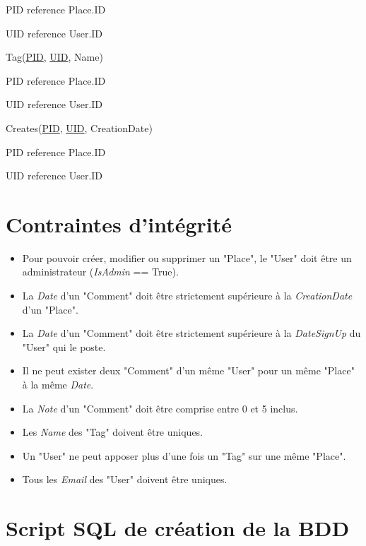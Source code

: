 \documentclass[a4paper,10pt]{article}
\begin{document}
PID reference Place.ID

UID reference User.ID

\hspace{-0,5cm}Tag(\underline{PID}, \underline{UID}, Name)

PID reference Place.ID

UID reference User.ID

\hspace{-0,5cm}Creates(\underline{PID}, \underline{UID}, CreationDate)

PID reference Place.ID

UID reference User.ID

\section{Contraintes d'intégrité}

\begin{itemize}
  \item Pour pouvoir créer, modifier ou supprimer un "Place", le "User" doit être un administrateur (\emph{IsAdmin} == True).
  \item La \emph{Date} d'un "Comment" doit être strictement supérieure à la \emph{CreationDate} d'un "Place".
  \item La \emph{Date} d'un "Comment" doit être strictement supérieure à la \emph{DateSignUp} du "User" qui le poste.
  \item Il ne peut exister deux "Comment" d'un même "User" pour un même "Place" à la même \emph{Date}.
  \item La \emph{Note} d'un "Comment" doit être comprise entre 0 et 5 inclus.
  \item Les \emph{Name} des "Tag" doivent être uniques.
  \item Un "User" ne peut apposer plus d'une fois un "Tag" sur une même "Place".
  \item Tous les \emph{Email} des "User" doivent être uniques.
\end{itemize}

\newpage

\section{Script SQL de création de la BDD}

\inputminted[bgcolor=black,firstline=1,lastline=50]{sql}{./../src/creation.sql}
\inputminted[bgcolor=black,firstline=51]{sql}{./../src/creation.sql}

\newpage
\end{document}

